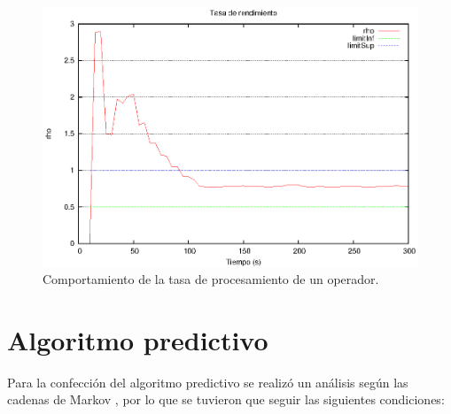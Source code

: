 \begin{figure}[hb!]
  \centering
    \includegraphics[scale=0.8]{images/Umbrales.eps}
  \caption{Comportamiento de la tasa de procesamiento de un operador.}
  \label{fig:umbrales}
\end{figure}


\section{Algoritmo predictivo}
Para la confección del algoritmo predictivo se realizó un análisis según las cadenas de Markov \citep{ching2006markov}, por lo que se tuvieron que seguir las siguientes condiciones:

